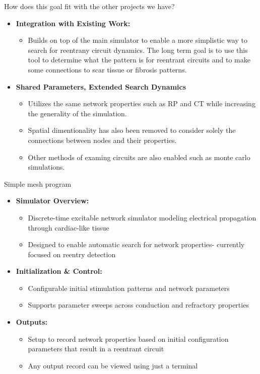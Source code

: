 \documentclass[aspectratio=43]{beamer}
\begin{document}
\begin{frame}{How does this goal fit with the other projects we have?}
    \begin{itemize}
    \item \textbf{Integration with Existing Work:}
    \begin{itemize}
        \item Builds on top of the main simulator to enable a more simplistic way
			to search for reentrany circuit dynamics. The long term goal is 
			to use this tool to determine what the pattern is for reentrant 
			circuits and to make some connections to scar tissue or fibrosis 
			patterns.
    \end{itemize}

    \item \textbf{Shared Parameters, Extended Search Dynamics}
    \begin{itemize}
        \item Utilizes the same network properties such as RP and CT while 
			increasing the generality of the simulation. 
		\item Spatial dimentionality has also been removed to 
			consider solely the connections between nodes and their properties.
		\item Other methods of examing circuits are also enabled such as 
			monte carlo simulations.
    \end{itemize}
\end{itemize}
\end{frame}

\begin{frame}{Simple mesh program}
\begin{itemize}
    \item \textbf{Simulator Overview:}
    \begin{itemize}
        \item Discrete-time excitable network simulator modeling electrical 
			propagation through cardiac-like tissue
		\item Designed to enable automatic search for network properties-
			currently focused on reentry detection
    \end{itemize}

    \item \textbf{Initialization \& Control:}
    \begin{itemize}
        \item Configurable initial stimulation patterns and network parameters
        \item Supports parameter sweeps across conduction and refractory properties
    \end{itemize}

    \item \textbf{Outputs:}
    \begin{itemize}
        \item Setup to record network properties based on initial configuration
			parameters that result in a reentrant circuit
		\item Any output record can be viewed using just a terminal
    \end{itemize}
\end{itemize}
\end{frame}
\end{document}
